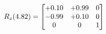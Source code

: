 \documentclass[preview]{standalone}
\begin{document}
\begin{align*}
\special{dvisvgm:raw <g id='unique000'>}R_{z}(4.82) = \begin{bmatrix}+0.10 & +0.99 & 0 \\-0.99 & +0.10 & 0 \\0 & 0 & 1\end{bmatrix}\special{dvisvgm:raw </g>}
\end{align*}
\end{document}
